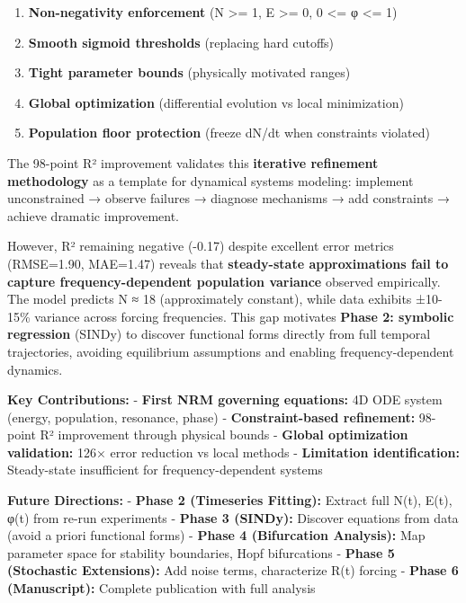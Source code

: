 \documentclass[
]{article}
\providecommand{\tightlist}{%
  \setlength{\itemsep}{0pt}\setlength{\parskip}{0pt}}
\begin{document}
\begin{enumerate}
\def\labelenumi{\arabic{enumi}.}
\tightlist
\item
  \textbf{Non-negativity enforcement} (N \textgreater= 1, E
  \textgreater= 0, 0 \textless= φ \textless= 1)
\item
  \textbf{Smooth sigmoid thresholds} (replacing hard cutoffs)
\item
  \textbf{Tight parameter bounds} (physically motivated ranges)
\item
  \textbf{Global optimization} (differential evolution vs local
  minimization)
\item
  \textbf{Population floor protection} (freeze dN/dt when constraints
  violated)
\end{enumerate}

The 98-point R² improvement validates this \textbf{iterative refinement
methodology} as a template for dynamical systems modeling: implement
unconstrained → observe failures → diagnose mechanisms → add constraints
→ achieve dramatic improvement.

However, R² remaining negative (-0.17) despite excellent error metrics
(RMSE=1.90, MAE=1.47) reveals that \textbf{steady-state approximations
fail to capture frequency-dependent population variance} observed
empirically. The model predicts N ≈ 18 (approximately constant), while
data exhibits ±10-15\% variance across forcing frequencies. This gap
motivates \textbf{Phase 2: symbolic regression} (SINDy) to discover
functional forms directly from full temporal trajectories, avoiding
equilibrium assumptions and enabling frequency-dependent dynamics.

\textbf{Key Contributions:} - \textbf{First NRM governing equations:} 4D
ODE system (energy, population, resonance, phase) -
\textbf{Constraint-based refinement:} 98-point R² improvement through
physical bounds - \textbf{Global optimization validation:} 126× error
reduction vs local methods - \textbf{Limitation identification:}
Steady-state insufficient for frequency-dependent systems

\textbf{Future Directions:} - \textbf{Phase 2 (Timeseries Fitting):}
Extract full N(t), E(t), φ(t) from re-run experiments - \textbf{Phase 3
(SINDy):} Discover equations from data (avoid a priori functional forms)
- \textbf{Phase 4 (Bifurcation Analysis):} Map parameter space for
stability boundaries, Hopf bifurcations - \textbf{Phase 5 (Stochastic
Extensions):} Add noise terms, characterize R(t) forcing - \textbf{Phase
6 (Manuscript):} Complete publication with full analysis
\end{document}
